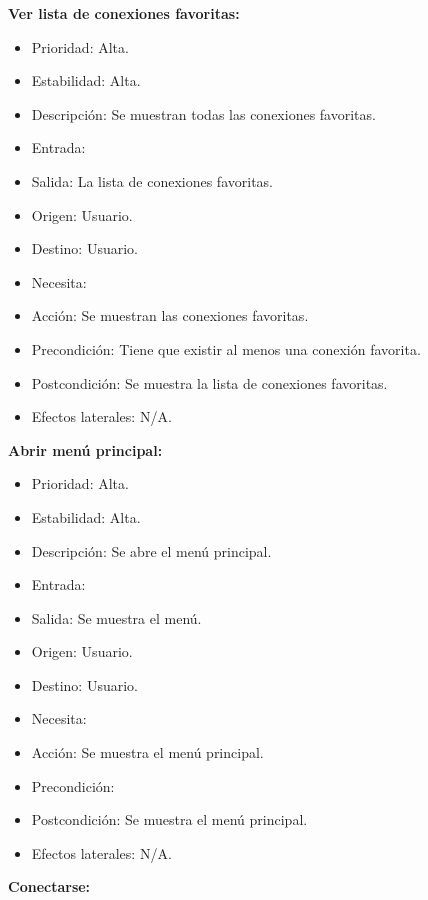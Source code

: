 \textbf{Ver lista de conexiones favoritas:}
\begin{itemize}
\item Prioridad: Alta.
\item Estabilidad: Alta.
\item Descripción: Se muestran todas las conexiones favoritas.
\item Entrada:
\item Salida: La lista de conexiones favoritas.
\item Origen: Usuario.
\item Destino: Usuario.
\item Necesita:
\item Acción: Se muestran las conexiones favoritas.
\item Precondición: Tiene que existir al menos una conexión favorita.
\item Postcondición: Se muestra la lista de conexiones favoritas.
\item Efectos laterales: N/A.\\

\end{itemize}
\newpage
\textbf{Abrir menú principal:}
\begin{itemize}
\item Prioridad: Alta.
\item Estabilidad: Alta.
\item Descripción: Se abre el menú principal.
\item Entrada:
\item Salida: Se muestra el menú.
\item Origen: Usuario.
\item Destino: Usuario.
\item Necesita:
\item Acción: Se muestra el menú principal.
\item Precondición:
\item Postcondición: Se muestra el menú principal.
\item Efectos laterales: N/A.\\

\end{itemize}

\textbf{Conectarse:}


